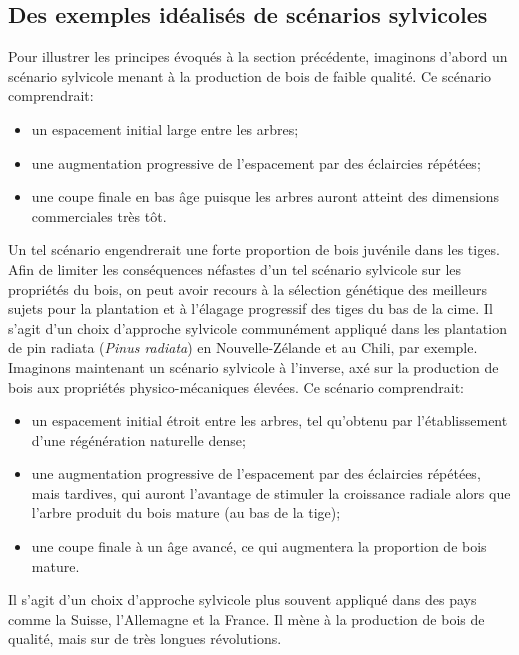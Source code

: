 \subsection{{Des exemples idéalisés de scénarios sylvicoles}}

Pour illustrer les principes évoqués à la section précédente, imaginons d'abord un scénario sylvicole menant à la production de bois de faible qualité. Ce scénario comprendrait:
\begin{itemize}
	\item un espacement initial large entre les arbres;
	\item une augmentation progressive de l'espacement par des éclaircies répétées;
	\item une coupe finale en bas âge puisque les arbres auront atteint des dimensions commerciales très tôt.
\end{itemize}

Un tel scénario engendrerait une forte proportion de bois juvénile dans les tiges. Afin de limiter les conséquences néfastes d'un tel scénario sylvicole sur les propriétés du bois, on peut avoir recours à la sélection génétique des meilleurs sujets pour la plantation et à l'élagage progressif des tiges du bas de la cime. Il s'agit d'un choix d'approche sylvicole communément appliqué dans les plantation de pin radiata (\textit{Pinus radiata}) en Nouvelle-Zélande et au Chili, par exemple.\\

Imaginons maintenant un scénario sylvicole à l'inverse, axé sur la production de bois aux propriétés physico-mécaniques élevées. Ce scénario comprendrait:

\begin{itemize}
	\item un espacement initial étroit entre les arbres, tel qu'obtenu par l'établissement d'une régénération naturelle dense;
	\item une augmentation progressive de l'espacement par des éclaircies répétées, mais tardives, qui auront l'avantage de stimuler la croissance radiale alors que l'arbre produit du bois mature (au bas de la tige);
	\item une coupe finale à un âge avancé, ce qui augmentera la proportion de bois mature.
\end{itemize}

Il s'agit d'un choix d'approche sylvicole plus souvent appliqué dans des pays comme la Suisse, l'Allemagne et la France. Il mène à la production de bois de qualité, mais sur de très longues révolutions.\\

